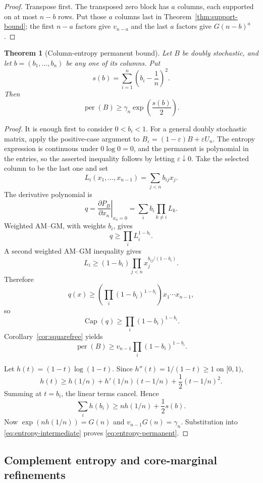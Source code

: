 \documentclass[11pt,a4paper]{article}
\numberwithin{equation}{section}
\newtheorem{theorem}{Theorem}[section]
\theoremstyle{definition}
\newcommand{\per}{\operatorname{per}}
\newcommand{\pcap}{\operatorname{Cap}}
\newcommand{\1}{\mathbf{1}}
\newcommand{\eps}{\varepsilon}
\begin{document}
\begin{proof}
Transpose first.  The transposed zero block has $a$ columns, each supported on at most $n-b$ rows.  Put those $a$ columns last in Theorem~\ref{thm:support-bound}; the first $n-a$ factors give $v_{n-a}$ and the last $a$ factors give $G(n-b)^a$.
\end{proof}

\begin{theorem}[Column-entropy permanent bound]\label{thm:column-entropy}
Let $B$ be doubly stochastic, and let $b=(b_1,\dots,b_n)$ be any one of its columns.  Put
\[
 s(b)=\sum_{i=1}^n\left(b_i-\frac1n\right)^2.
\]
Then
\begin{equation}\label{eq:entropy-permanent}
 \per(B)\ge\gamma_n\exp\left(\frac{s(b)}2\right).
\end{equation}
\end{theorem}

\begin{proof}
It is enough first to consider $0<b_i<1$.  For a general doubly stochastic
matrix, apply the positive-case argument to
$B_\eps=(1-\eps)B+\eps U_n$.  The entropy expression is continuous under
$0\log0=0$, and the permanent is polynomial in the entries, so the asserted
inequality follows by letting $\eps\downarrow0$.  Take the selected column
to be the last one and set
\[
 L_i(x_1,\dots,x_{n-1})=\sum_{j<n}b_{ij}x_j.
\]
The derivative polynomial is
\[
 q=\left.\frac{\partial P_B}{\partial x_n}\right|_{x_n=0}
 =\sum_i b_i\prod_{k\ne i}L_k.
\]
Weighted AM--GM, with weights $b_i$, gives
\[
 q\ge\prod_iL_i^{1-b_i}.
\]
A second weighted AM--GM inequality gives
\[
 L_i\ge(1-b_i)
 \prod_{j<n}x_j^{b_{ij}/(1-b_i)}.
\]
Therefore
\[
 q(x)\ge
 \left(\prod_i(1-b_i)^{1-b_i}\right)x_1\cdots x_{n-1},
\]
so
\[
 \pcap(q)\ge\prod_i(1-b_i)^{1-b_i}.
\]
Corollary~\ref{cor:squarefree} yields
\begin{equation}\label{eq:entropy-intermediate}
 \per(B)\ge
 v_{n-1}\prod_i(1-b_i)^{1-b_i}.
\end{equation}

Let $h(t)=(1-t)\log(1-t)$.  Since $h''(t)=1/(1-t)\ge1$ on $[0,1)$,
\[
 h(t)\ge h(1/n)+h'(1/n)(t-1/n)+\frac12(t-1/n)^2.
\]
Summing at $t=b_i$, the linear terms cancel.  Hence
\[
 \sum_i h(b_i)
 \ge nh(1/n)+\frac12s(b).
\]
Now $\exp(nh(1/n))=G(n)$ and $v_{n-1}G(n)=\gamma_n$.  Substitution into \eqref{eq:entropy-intermediate} proves \eqref{eq:entropy-permanent}.
\end{proof}


\subsection{Complement entropy and core-marginal refinements}
\end{document}
